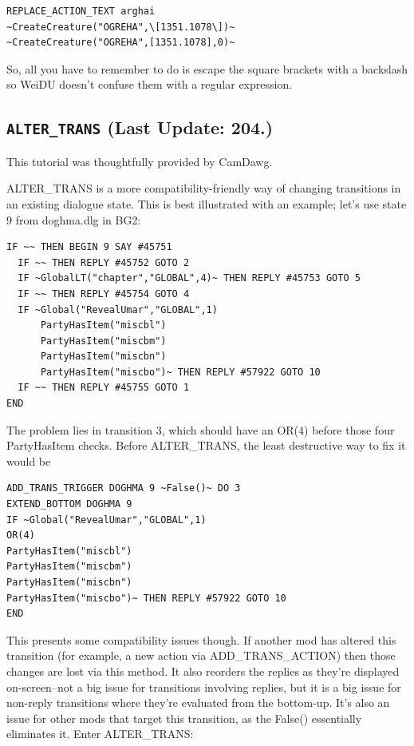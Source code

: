 \documentclass{article}
\def\t#1{{\tt #1}}
\begin{document}
\begin{verbatim}
REPLACE_ACTION_TEXT arghai
~CreateCreature("OGREHA",\[1351.1078\])~
~CreateCreature("OGREHA",[1351.1078],0)~
\end{verbatim}

So, all you have to remember to do is escape the square brackets with a
backslash so WeiDU doesn't confuse them with a regular expression.

\label{sec-alter-trans}\subsection{\t{ALTER_TRANS} (Last Update: 204.)}
This tutorial was thoughtfully provided by CamDawg.

ALTER_TRANS is a more compatibility-friendly way of changing
transitions in an existing dialogue state. This is best illustrated
with an example; let's use state 9 from doghma.dlg in BG2:

\begin{verbatim}
IF ~~ THEN BEGIN 9 SAY #45751
  IF ~~ THEN REPLY #45752 GOTO 2
  IF ~GlobalLT("chapter","GLOBAL",4)~ THEN REPLY #45753 GOTO 5
  IF ~~ THEN REPLY #45754 GOTO 4
  IF ~Global("RevealUmar","GLOBAL",1)
      PartyHasItem("miscbl")
      PartyHasItem("miscbm")
      PartyHasItem("miscbn")
      PartyHasItem("miscbo")~ THEN REPLY #57922 GOTO 10
  IF ~~ THEN REPLY #45755 GOTO 1
END
\end{verbatim}


The problem lies in transition 3, which should have an OR(4) before
those four PartyHasItem checks. Before ALTER_TRANS, the least
destructive way to fix it would be

\begin{verbatim}
ADD_TRANS_TRIGGER DOGHMA 9 ~False()~ DO 3
EXTEND_BOTTOM DOGHMA 9
IF ~Global("RevealUmar","GLOBAL",1)
OR(4)
PartyHasItem("miscbl")
PartyHasItem("miscbm")
PartyHasItem("miscbn")
PartyHasItem("miscbo")~ THEN REPLY #57922 GOTO 10
END
\end{verbatim}


This presents some compatibility issues though. If another mod has
altered this transition (for example, a new action via
ADD_TRANS_ACTION) then those changes are lost via this method. It also
reorders the replies as they're displayed on-screen--not a big issue
for transitions involving replies, but it is a big issue for non-reply
transitions where they're evaluated from the bottom-up. It's also an
issue for other mods that target this transition, as the False()
essentially eliminates it. Enter ALTER_TRANS:
\end{document}
